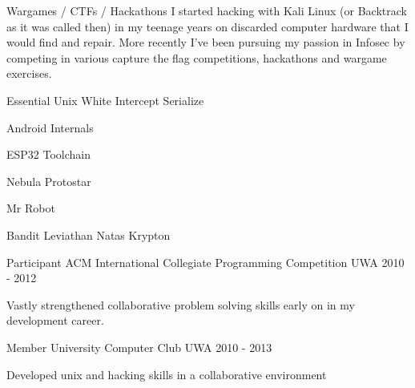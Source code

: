 \begin{cventries}
    \cventrysimple
        {Wargames / CTFs / Hackathons}
        {
            I started hacking with Kali Linux (or Backtrack as it was called then) in my teenage years on discarded computer hardware that I would find and repair. More recently I've been pursuing my passion in Infosec by competing in various capture the flag competitions, hackathons and wargame exercises.
        }
        {
            \begin{cvitems}
                \item { \acvSubItemSep Essential \acvSubItemSep Unix \acvSubItemSep White \acvSubItemSep Intercept \acvSubItemSep Serialize}
                \item { }
                \item { \acvSubItemSep Android Internals}
                \item { \acvSubItemSep ESP32 Toolchain}
                \item { \acvSubItemSep Nebula \acvSubItemSep Protostar}
                \item { \acvSubItemSep Mr Robot}
                \item { \acvSubItemSep Bandit \acvSubItemSep Leviathan \acvSubItemSep Natas \acvSubItemSep Krypton}
            \end{cvitems}
        }

  \cventry
    {Participant} %
    {ACM International Collegiate Programming Competition} %
    {UWA} %
    {2010 - 2012} %
    {
      \begin{cvitems} %
        \item {Vastly strengthened collaborative problem solving skills early on in my development career.}
      \end{cvitems}
    }

  \cventry
    {Member} %
    {University Computer Club} %
    {UWA} %
    {2010 - 2013} %
    {
      \begin{cvitems} %
        \item {Developed unix and hacking skills in a collaborative environment}
      \end{cvitems}
    }

\end{cventries}
